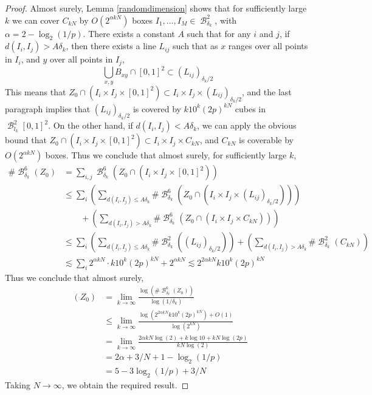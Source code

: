 \documentclass[dvipsnames,letterpaper,12pt]{article}
\numberwithin{equation}{section}
\theoremstyle{plain}
\DeclareMathOperator{\minkdim}{\dim_{\mathbf{M}}}
\DeclareMathOperator{\B}{\mathcal{B}}
\begin{document}
\begin{proof}
	Almost surely, Lemma \ref{randomdimension} shows that for sufficiently large $k$ we can cover $C_{kN}$ by $O(2^{\alpha kN})$ boxes $I_1, \dots, I_M \in \B^2_{\delta_k}$, with $\alpha = 2 - \log_2(1/p)$. There exists a constant $A$ such that for any $i$ and $j$, if $d(I_i, I_j) > A \delta_k$, then there exists a line $L_{ij}$ such that as $x$ ranges over all points in $I_i$, and $y$ over all points in $I_j$,
	\[ \bigcup_{x,y} B_{xy} \cap [0,1]^2 \subset (L_{ij})_{\delta_k/2} \]
	This means that $Z_0 \cap (I_i \times I_j \times [0,1]^2) \subset I_i \times I_j \times (L_{ij})_{\delta_k/2}$, and the last paragraph implies that $(L_{ij})_{\delta_k/2}$ is covered by $k 10^k (2p)^{kN}$ cubes in $\B^2_{l_k}[0,1]^2$. On the other hand, if $d(I_i,I_j) < A \delta_k$, we can apply the obvious bound that $Z_0 \cap (I_i \times I_j \times [0,1]^2) \subset I_i \times I_j \times C_{kN}$, and $C_{kN}$ is coverable by $O(2^{\alpha kN})$ boxes. Thus we conclude that almost surely, for sufficiently large $k$,
	\begin{align*}
		\# \B^6_{\delta_k}(Z_0) &= \sum_{i,j} \B^6_{\delta_k}(Z_0 \cap (I_i \times I_j \times [0,1]^2)) \\
		&\leq \sum_i \left( \sum_{d(I_i,I_j) \leq A \delta_k} \# \B^6_{\delta_k}(Z_0 \cap (I_i \times I_j \times (L_{ij})_{\delta_k/2})) \right)\\
		&\quad\quad+ \left( \sum_{d(I_i,I_j) > A \delta_k} \# \B^6_{\delta_k}(Z_0 \cap (I_i \times I_j \times C_{kN})) \right)\\
		&\leq \sum_i \left( \sum_{d(I_i,I_j) \leq A \delta_k} \# \B^2_{\delta_k}((L_{ij})_{\delta_k/2}) \right) + \left( \sum_{d(I_i,I_j) > A \delta_k} \# \B^2_{\delta_k}(C_{kN}) \right)\\
		&\lesssim \sum_i 2^{\alpha kN} \cdot k 10^k (2p)^{kN} + 2^{\alpha kN} \lesssim 2^{2\alpha kN} k 10^k (2p)^{kN}
	\end{align*}
	Thus we conclude that almost surely,
	\begin{align*}
		\minkdim(Z_0) &= \lim_{k \to \infty} \frac{\log \left( \# \B^6_{\delta_k}(Z_0) \right)}{\log(1/\delta_k)}\\
		&\leq \lim_{k \to \infty} \frac{\log(2^{2 \alpha kN} k 10^k (2p)^{kN}) + O(1)}{\log(2^{kN})}\\
		&= \lim_{k \to \infty} \frac{2 \alpha k N \log(2) + k \log 10 + kN \log(2p)}{kN \log(2)}\\
		&= 2 \alpha + 3/N + 1 - \log_2(1/p)\\
		&= 5 - 3\log_2(1/p) + 3/N
	\end{align*}
	Taking $N \to \infty$, we obtain the required result.
\end{proof}
\end{document}
